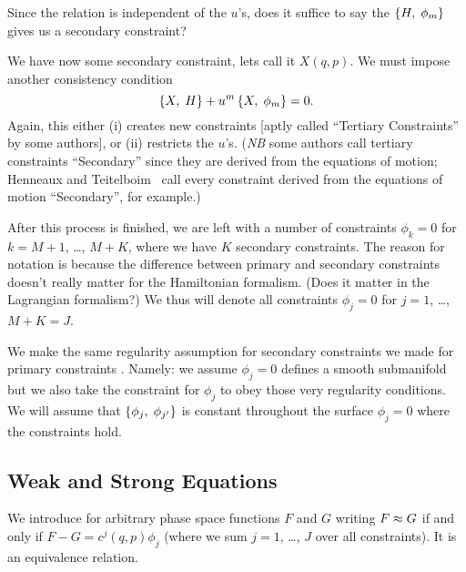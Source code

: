\begin{puzzle}
Since the relation is independent of the $u$'s, does it suffice to say
the $\left\{H,\;\phi_{m}\right\}$ gives us a secondary constraint?
\end{puzzle}

We have now some secondary constraint, lets call it $X(q,p)$. We must
impose another consistency condition
\begin{equation}
\left\{X,\;H\right\}+u^{m}\left\{X,\;\phi_{m}\right\}=0.
\end{equation}
Again, this either (i) creates new constraints [aptly called ``Tertiary
  Constraints'' by some authors], or (ii) restricts the
$u$'s. (\emph{NB} some authors call tertiary constraints ``Secondary''
since they are derived from the equations of motion; Henneaux and
Teitelboim~\cite{Henneaux:1992ig} call every constraint derived from the
equations of motion ``Secondary'', for example.)

After this process is finished, we are left with a number of constraints
$\phi_{k}=0$ for $k=M+1$, \dots, $M+K$, where we have $K$ secondary
constraints. The reason for notation is because the difference between
primary and secondary constraints doesn't really matter for the
Hamiltonian formalism. (Does it matter in the Lagrangian formalism?) We
thus will denote all constraints $\phi_{j}=0$ for $j=1$, \dots,
$M+K=J$.

We make the same regularity assumption for secondary constraints we made
for primary constraints .
Namely: we assume $\phi_{j}=0$ defines a smooth submanifold but we also
take the constraint for $\phi_{j}$ to obey those very regularity
conditions. We will assume that $\left\{\phi_{j},\;\phi_{j'}\right\}$
is constant throughout the surface $\phi_{j}=0$ where the constraints
hold.

\subsection{Weak and Strong Equations}

\begin{definition}
We introduce 
for arbitrary phase space functions
$F$ and $G$ writing $F\approx G$ if and only if $F-G = c^{j}(q,p)\phi_{j}$
(where we sum $j=1$, \dots, $J$ over all constraints). It is an
equivalence relation.
\end{definition}

